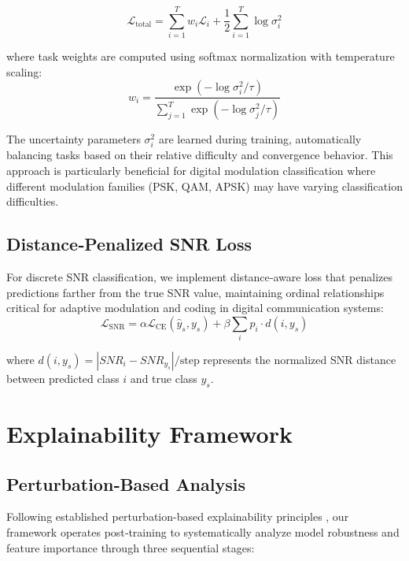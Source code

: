\documentclass{ELSP}
\begin{document}
\begin{equation}
\mathcal{L}_{\text{total}} = \sum_{i=1}^{T} w_i \mathcal{L}_i + \frac{1}{2}\sum_{i=1}^{T} \log \sigma_i^2
\end{equation}

where task weights are computed using softmax normalization with temperature scaling:
\begin{equation}
w_i = \frac{\exp(-\log \sigma_i^2 / \tau)}{\sum_{j=1}^{T} \exp(-\log \sigma_j^2 / \tau)}
\end{equation}

The uncertainty parameters $\sigma_i^2$ are learned during training, automatically balancing tasks based on their relative difficulty and convergence behavior. This approach is particularly beneficial for digital modulation classification where different modulation families (PSK, QAM, APSK) may have varying classification difficulties.

\subsection{Distance‑Penalized SNR Loss}

For discrete SNR classification, we implement distance‑aware loss that penalizes predictions farther from the true SNR value, maintaining ordinal relationships critical for adaptive modulation and coding in digital communication systems:
\begin{equation}
\mathcal{L}_{\text{SNR}} = \alpha \mathcal{L}_{\text{CE}}(\hat{y}_s, y_s) + \beta \sum_{i} p_i \cdot d(i, y_s)
\end{equation}

where $d(i, y_s) = |SNR_i - SNR_{y_s}| / \text{step}$ represents the normalized SNR distance between predicted class $i$ and true class $y_s$.

\section{Explainability Framework}

\subsection{Perturbation‑Based Analysis}

Following established perturbation-based explainability principles \cite{fong2017interpretable,IVANOVS2021228}, our framework operates post‑training to systematically analyze model robustness and feature importance through three sequential stages:
\end{document}
